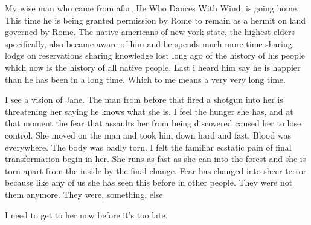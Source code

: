 My wise man who came from afar, He Who Dances With Wind, is going home. This time he is being granted permission by Rome to remain as a hermit on land governed by Rome. 
The native americans of new york state, the highest elders specifically, also became aware of him and he spends much more time sharing lodge on reservations sharing knowledge lost long ago of the history of his people which now is the history of all native people. Last i heard him say he is happier than he has been in a long time. Which to me means a very very long time.

I see a vision of Jane. The man from before that fired a shotgun into her is threatening her saying he knows what she is. I feel the hunger she has, and at that moment the fear that assaults her from being discovered caused her to lose control. She moved on the man and took him down hard and fast. Blood was everywhere. The body was badly torn. I felt the familiar ecstatic pain of final transformation begin in her. She runs as fast as she can into the forest and she is torn apart from the inside by the final change. Fear has changed into sheer terror because like any of us she has seen this before in other people. They were not them anymore. They were, something, else.

I need to get to her now before it's too late.

